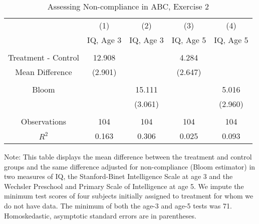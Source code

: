 \begin{table}[H] 
\begin{threeparttable}
\caption{Assessing Non-compliance in ABC, Exercise 2}
\label{table:nc2}
\centering 
\begin{tabular}{ccccc} \toprule
 & (1) & (2) & (3) & (4) \\
 & IQ, Age 3 & IQ, Age 3  & IQ, Age 5 & IQ, Age 5 \\ \midrule
 &  &  & & \\
Treatment - Control & 12.908 &  & 4.284 &  \\
 Mean Difference & (2.901) &  & (2.647) &  \\
  &  &  & & \\
Bloom &  & 15.111 &  & 5.016 \\
 &  & (3.061) &  & (2.960) \\ \\ \midrule
Observations & 104 & 104 & 104 & 104 \\
 $R^2$ & 0.163 & 0.306 & 0.025 & 0.093 \\ \bottomrule
 \end{tabular}
\begin{tablenotes}
\footnotesize
\item Note: This table displays the mean difference between the treatment and control groups and the same difference adjusted for non-compliance (Bloom estimator) in two measures of IQ, the Stanford-Binet Intelligence Scale at age 3 and the Wechsler Preschool and Primary Scale of Intelligence at age 5. We impute the minimum test scores of four subjects initially assigned to treatment for whom we do not have data. The minimum of both the age-3 and age-5 tests was 71. Homoskedastic, asymptotic standard errors are in parentheses.
\end{tablenotes}
\end{threeparttable}
\end{table}

